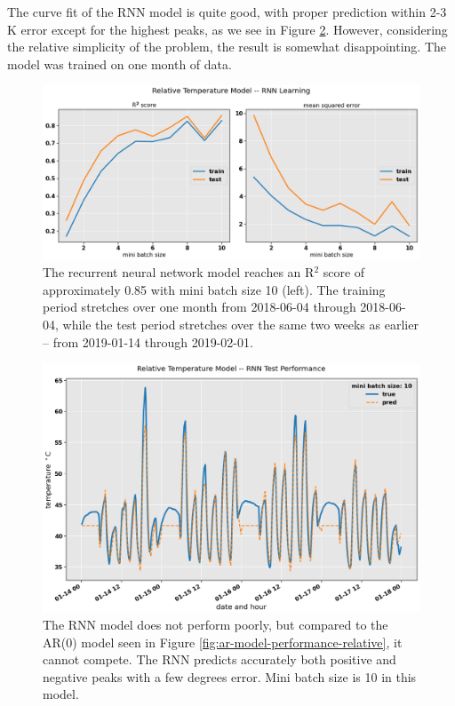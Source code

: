 \documentclass[]{article}
\begin{document}
The curve fit of the RNN model is quite good, with proper prediction within 2-3 K error except for the highest peaks, as we see in Figure \ref{fig:rnn-model-performance-relative}. However, considering the relative simplicity of the problem, the result is somewhat disappointing. The model was trained on one month of data.

\begin{figure}[!h]
	\centering
	\includegraphics[width=1\linewidth]{./figs/rnn-model-learning-relative.png}
	\caption{The recurrent neural network model reaches an R$^2$ score of approximately 0.85 with mini batch size 10 (left). The training period stretches over one month from 2018-06-04 through 2018-06-04, while the test period stretches over the same two weeks as earlier -- from 2019-01-14 through 2019-02-01.}
	\label{fig:rnn-model-learning-relative}
\end{figure}

\begin{figure}[!h]
	\centering
	\includegraphics[width=1\linewidth]{./figs/rnn-model-performance-relative.png}
	\caption{The RNN model does not perform poorly, but compared to the AR(0) model seen in Figure \ref{fig:ar-model-performance-relative}, it cannot compete. The RNN predicts accurately both positive and negative peaks with a few degrees error. Mini batch size is 10 in this model.}
	\label{fig:rnn-model-performance-relative}
\end{figure}
\end{document}
